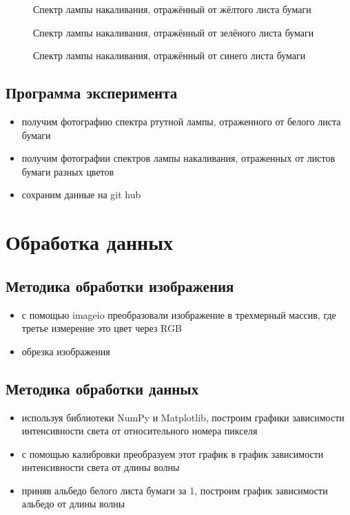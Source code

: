 \documentclass[a4paper,12pt]{article} %
\begin{document}
\begin{figure}[h]
                \caption{Спектр лампы накаливания, отражённый от жёлтого листа бумаги}
\end{figure}

\begin{figure}[h]
                \caption{Спектр лампы накаливания, отражённый от зелёного листа бумаги}
\end{figure}

\begin{figure}[h]
                \caption{Спектр лампы накаливания, отражённый от синего листа бумаги}
\end{figure}

\clearpage
\subsection{Программа эксперимента}


\begin{itemize}
\item получим фотографию спектра ртутной лампы, отраженного от белого листа бумаги
\item получим фотографии спектров лампы накаливания, отраженных от листов бумаги разных цветов
\item сохраним данные на git hub
\end{itemize}


\section{Обработка данных}
\subsection{Методика обработки изображения}

\begin{itemize}
\item с помощью imageio преобразовали изображение в трехмерный массив, где третье измерение это цвет через RGB
\item обрезка изображения
\end{itemize}


\subsection{Методика обработки данных}
\begin{itemize}
    \item используя библиотеки NumPy и Matplotlib, построим графики зависимости интенсивности света от относительного номера пикселя
    \item с помощью калибровки преобразуем этот график в график зависимости интенсивности света от длины волны
    \item приняв альбедо белого листа бумаги за 1, построим график зависимости альбедо от длины волны


\end{itemize}
\end{document}
